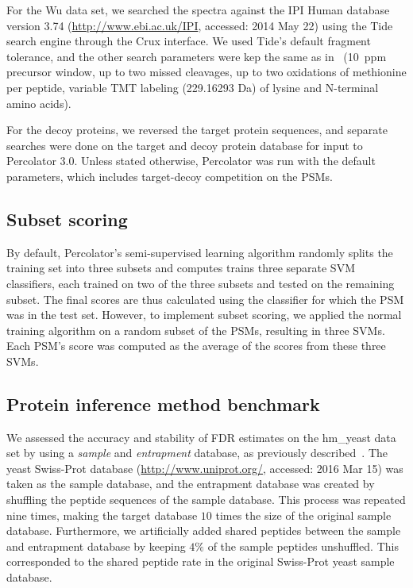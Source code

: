 \documentclass{article}
\begin{document}
For the Wu data set, we searched the spectra against the IPI Human
database version 3.74 (\url{http://www.ebi.ac.uk/IPI}, accessed: 2014
May 22) using the Tide search engine through the Crux interface. We
used Tide's default fragment tolerance, and the other search
parameters were kep the same as in~\cite{wu2013} (10~ppm precursor
window, up to two missed cleavages, up to two oxidations of methionine
per peptide, variable TMT labeling (229.16293 Da) of lysine and
N-terminal amino acids).

For the decoy proteins, we reversed the target protein sequences, and
separate searches were done on the target and decoy protein database
for input to Percolator 3.0. Unless stated otherwise, Percolator was
run with the default parameters, which includes target-decoy
competition on the PSMs.

\subsection*{Subset scoring}

By default, Percolator's semi-supervised learning algorithm randomly
splits the training set into three subsets and computes trains three
separate SVM classifiers, each trained on two of the three subsets and
tested on the remaining subset.  The final scores are thus calculated
using the classifier for which the PSM was in the test set. However,
to implement subset scoring, we applied the normal training algorithm
on a random subset of the PSMs, resulting in three SVMs.  Each PSM's
score was computed as the average of the scores from these three SVMs.

\subsection*{Protein inference method benchmark}

We assessed the accuracy and stability of FDR estimates on the
hm\_yeast data set by using a {\em sample} and {\em entrapment}
database, as previously described~\cite{granholm2013determining}. The
yeast Swiss-Prot database (\url{http://www.uniprot.org/}, accessed:
2016 Mar 15) was taken as the sample database, and the entrapment
database was created by shuffling the peptide sequences of the sample
database. This process was repeated nine times, making the target
database $10$ times the size of the original sample database.
Furthermore, we artificially added shared peptides between the sample
and entrapment database by keeping $4\%$ of the sample peptides
unshuffled. This corresponded to the shared peptide rate in the
original Swiss-Prot yeast sample database.
\end{document}

